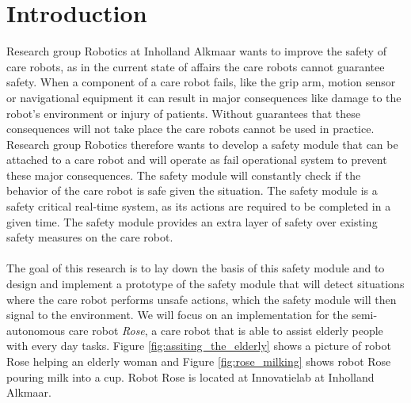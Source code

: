 \documentclass[12pt]{scrreprt}
\begin{document}
\tableofcontents
\listoffigures
\listoftables
\newpage
{}

\chapter{Introduction}
\label{Introduction}
Research group Robotics at Inholland Alkmaar wants to improve the safety of care robots, as in the current state of affairs the care robots cannot guarantee safety. When a component of a care robot fails, like the grip arm, motion sensor or navigational equipment it can result in major consequences like damage to the robot's environment or injury of patients. Without guarantees that these consequences will not take place the care robots cannot be used in practice. Research group Robotics therefore wants to develop a safety module that can be attached to a care robot and will operate as fail operational system to prevent these major consequences. The safety module will constantly check if the behavior of the care robot is safe given the situation. The safety module is a safety critical real-time system, as its actions are required to be completed in a given time. The safety module provides an extra layer of safety over existing safety measures on the care robot.
\\\\
The goal of this research is to lay down the basis of this safety module and to design and implement a prototype of the safety module that will detect situations where the care robot performs unsafe actions, which the safety module will then signal to the environment. We will focus on an implementation for the semi-autonomous care robot \textit{Rose}, a care robot that is able to assist elderly people with every day tasks. Figure \ref{fig:assiting_the_elderly} shows a picture of robot Rose helping an elderly woman and Figure \ref{fig:rose_milking} shows robot Rose pouring milk into a cup. Robot Rose is located at Innovatielab at Inholland Alkmaar.
\\\\
\end{document}
